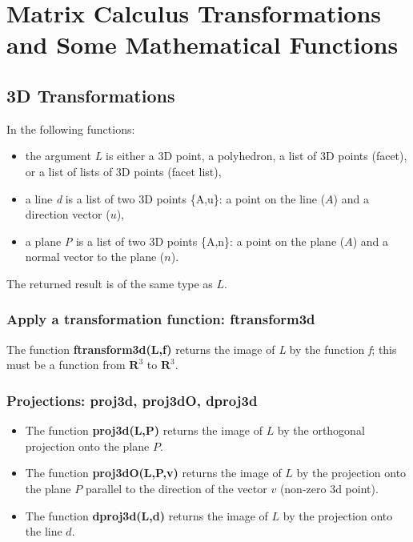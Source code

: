 \section{Matrix Calculus Transformations and Some Mathematical Functions}

\subsection{3D Transformations}

In the following functions:
\begin{itemize}
\item the argument \emph{L} is either a 3D point, a polyhedron, a list of 3D points (facet), or a list of lists of 3D points (facet list),
\item a line \emph{d} is a list of two 3D points \{A,u\}: a point on the line ($A$) and a direction vector ($u$),
\item a plane \emph{P} is a list of two 3D points \{A,n\}: a point on the plane ($A$) and a normal vector to the plane ($n$).
\end{itemize}
The returned result is of the same type as $L$.

\subsubsection{Apply a transformation function: ftransform3d}

The function \textbf{ftransform3d(L,f)} returns the image of \emph{L} by the function \emph{f}; this must be a function from $\mathbf R^3$ to $\mathbf R^3$.

\subsubsection{Projections: proj3d, proj3dO, dproj3d}

\begin{itemize}
\item The function \textbf{proj3d(L,P)} returns the image of $L$ by the orthogonal projection onto the plane $P$.
\item The function \textbf{proj3dO(L,P,v)} returns the image of $L$ by the projection onto the plane $P$ parallel to the direction of the vector $v$ (non-zero 3d point).
\item The function \textbf{dproj3d(L,d)} returns the image of $L$ by the projection onto the line $d$.
\end{itemize}

